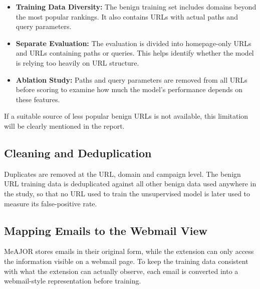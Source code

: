 \documentclass{FastFyp}
\begin{document}
\begin{itemize}
    \item \textbf{Training Data Diversity:} The benign training set includes domains beyond the most popular rankings. It also contains URLs with actual paths and query parameters.

    \item \textbf{Separate Evaluation:} The evaluation is divided into homepage-only URLs and URLs containing paths or queries. This helps identify whether the model is relying too heavily on URL structure.

    \item \textbf{Ablation Study:} Paths and query parameters are removed from all URLs before scoring to examine how much the model's performance depends on these features.
\end{itemize}

If a suitable source of less popular benign URLs is not available, this limitation will be clearly mentioned in the report.

\subsection{Cleaning and Deduplication}
Duplicates are removed at the URL, domain and campaign level. The benign URL training data is deduplicated against all other benign data used anywhere in the study, so that no URL used to train the unsupervised model is later used to measure its false-positive rate.

\subsection{Mapping Emails to the Webmail View}

MeAJOR stores emails in their original form, while the extension can only access the information visible on a webmail page. To keep the training data consistent with what the extension can actually observe, each email is converted into a webmail-style representation before training.
\end{document}
